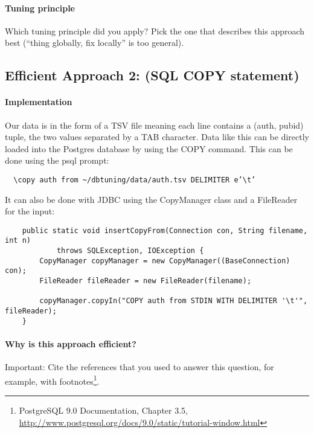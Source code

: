 \documentclass[11pt]{scrartcl}
\begin{document}
  \paragraph{Tuning principle}

  Which tuning principle did you apply? Pick the one that describes
  this approach best (``thing globally, fix locally'' is too general).

    \subsection*{Efficient Approach 2: (SQL COPY statement)}

  \paragraph{Implementation}

  Our data is in the form of a TSV file meaning each line contains a
  (auth, pubid) tuple, the two values separated by a TAB character. Data like this can be
  directly loaded into the Postgres database by using the COPY command. This can be
  done using the psql prompt:
  
  {\small
\begin{verbatim}
  \copy auth from ~/dbtuning/data/auth.tsv DELIMITER e’\t’
\end{verbatim}
}

It can also be done with JDBC using the CopyManager class and a FileReader
for the input:

{\small
\begin{verbatim}
	public static void insertCopyFrom(Connection con, String filename, int n)
	        throws SQLException, IOException {
	    CopyManager copyManager = new CopyManager((BaseConnection) con);
	    FileReader fileReader = new FileReader(filename);
		
	    copyManager.copyIn("COPY auth from STDIN WITH DELIMITER '\t'", fileReader);
	}
\end{verbatim}
}

  \paragraph{Why is this approach efficient?}

  
  
  Important: Cite the references that you used to answer this
  question, for example, with footnotes\footnote{PostgreSQL 9.0
    Documentation, Chapter 3.5,
    \url{http://www.postgresql.org/docs/9.0/static/tutorial-window.html}}.
\end{document}
